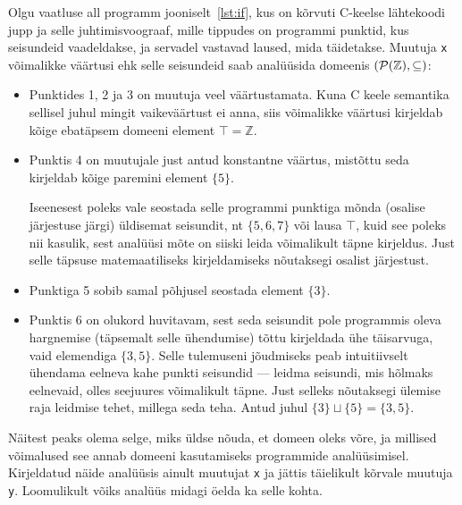 \documentclass[../thesis.tex]{subfiles}
\begin{document}
Olgu vaatluse all programm jooniselt~\ref{lst:if}, kus on kõrvuti C-keelse lähtekoodi jupp ja selle juhtimisvoograaf, mille tippudes on programmi punktid, kus seisundeid vaadeldakse, ja servadel vastavad laused, mida täidetakse. Muutuja \texttt{x} võimalikke väärtusi ehk selle seisundeid saab analüüsida domeenis $(\mathcal{P}(\mathbb{Z}), \subseteq)$:
\begin{itemize}
	\item Punktides 1, 2 ja 3 on muutuja veel väärtustamata. Kuna C keele semantika sellisel juhul mingit vaikeväärtust ei anna, siis võimalikke väärtusi kirjeldab kõige ebatäpsem domeeni element $\top = \mathbb{Z}$.
	\item Punktis 4 on muutujale just antud konstantne väärtus, mistõttu seda kirjeldab kõige paremini element $\{5\}$.

		Iseenesest poleks vale seostada selle programmi punktiga mõnda (osalise järjestuse järgi) üldisemat seisundit, nt $\{5, 6, 7\}$ või lausa $\top$, kuid see poleks nii kasulik, sest analüüsi mõte on siiski leida võimalikult täpne kirjeldus. Just selle täpsuse matemaatiliseks kirjeldamiseks nõutaksegi osalist järjestust.
	\item Punktiga 5 sobib samal põhjusel seostada element $\{3\}$.
	\item Punktis 6 on olukord huvitavam, sest seda seisundit pole programmis oleva hargnemise (täpsemalt selle ühendumise) tõttu kirjeldada ühe täisarvuga, vaid elemendiga $\{3, 5\}$. Selle tulemuseni jõudmiseks peab intuitiivselt ühendama eelneva kahe punkti seisundid --- leidma seisundi, mis hõlmaks eelnevaid, olles seejuures võimalikult täpne. Just selleks nõutaksegi ülemise raja leidmise tehet, millega seda teha. Antud juhul $\{3\} \sqcup \{5\} = \{3, 5\}$.
\end{itemize}

Näitest peaks olema selge, miks üldse nõuda, et domeen oleks võre, ja millised võimalused see annab domeeni kasutamiseks programmide analüüsimisel. Kirjeldatud näide analüüsis ainult muutujat \texttt{x} ja jättis täielikult kõrvale muutuja \texttt{y}. Loomulikult võiks analüüs midagi öelda ka selle kohta.

\end{document}
